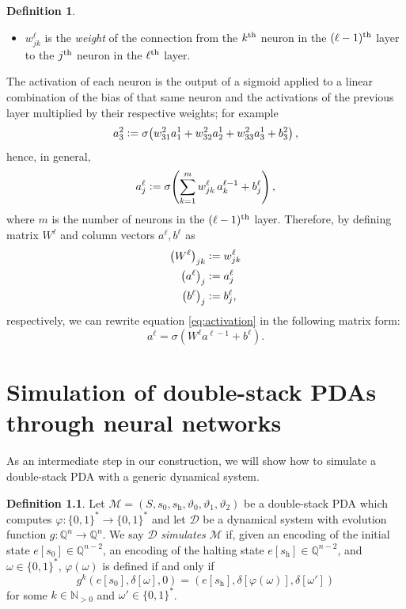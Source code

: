 \documentclass{book}
\newcommand{\defeq}{\vcentcolon=}
\newcommand{\Q}{\mathbb{Q}}
\newcommand{\h}{\mathrm{h}}
\theoremstyle{definition}
\newtheorem{definition}{Definition}[chapter]
\theoremstyle{plain}
\theoremstyle{plain}
\theoremstyle{remark}
\theoremstyle{plain}
\begin{document}
\begin{definition}
\begin{itemize}
			\item $w_{jk}^\ell$ is the \emph{weight} of the connection from the $k\textsuperscript{th}$ neuron in the $(\ell-1)\textsuperscript{th}$ layer to the $j\textsuperscript{th}$ neuron in the $\ell\textsuperscript{th}$ layer.
		\end{itemize}
		The activation of each neuron is the output of a sigmoid applied to a linear combination of the bias of that same neuron and the activations of the previous layer multiplied by their respective weights; for example
		$$
			a_3^2\defeq\sigma\!\left(w_{31}^2a_1^1+w_{32}^2a_2^1+w_{33}^2a_3^1+b_3^2\right),
		$$
		hence, in general,
		\begin{equation} \label{eq:activation}
			a_j^\ell\defeq\sigma\!\left(\sum_{k=1}^{m}w_{jk}^\ell\,a_k^{\ell-1}+b_j^\ell \right),
		\end{equation}
		where $m$ is the number of neurons in the $(\ell-1)\textsuperscript{th}$ layer. Therefore, by defining matrix $W^\ell$ and column vectors $a^\ell,b^\ell$ as 
		\begin{align*}
			\left(W^\ell\right)_{jk} &\defeq w_{jk}^\ell \\
			\left(a^\ell\right)_j    &\defeq a_j^\ell \\
			\left(b^\ell\right)_j	 &\defeq b_j^\ell,
		\end{align*}
		respectively, we can rewrite equation \ref{eq:activation} in the following matrix form:
		$$
			a^\ell=\sigma\!\left(W^\ell a^{\ell-1}+b^\ell\right).
		$$
	\end{definition}
	
	
	\chapter{Simulation of double-stack PDAs through neural networks}  \label{chap:simulation}
	As an intermediate step in our construction, we will show how to simulate a double-stack PDA with a generic dynamical system.
	\begin{definition}
		Let $\mathcal{M}=(S,s_0,s_\h,\vartheta_0,\vartheta_1,\vartheta_2)$ be a double-stack PDA which computes $\varphi:\{0,1\}^* \to \{0,1\}^*$ and let $\mathcal{D}$ be a dynamical system with evolution function $g:\Q^n\to\Q^n$. We say $\mathcal{D}$ \emph{simulates} $\mathcal{M}$ if, given an encoding of the initial state $e[s_0]\in\Q^{n-2}$, an encoding of the halting state $e[s_\h]\in\Q^{n-2}$, and $\omega\in\{0,1\}^*$, $\varphi(\omega)$ is defined if and only if
		$$
			g^k(e[s_0],\delta[\omega],0)=(e[s_\h],\delta[\varphi(\omega)],\delta[\omega'])
		$$ 
		for some $k\in\mathbb{N}_{>0}$ and $\omega'\in\{0,1\}^*$.
	\end{definition}
	
\end{document}
